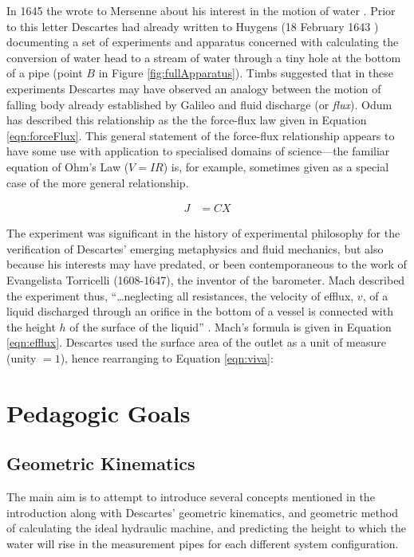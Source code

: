 \documentclass{article}
\begin{document}
In 1645 the  wrote to Mersenne about his interest in the motion of water \cite[p.~138,sec.~571]{descartes_philosophical_1991-1}. Prior to this letter Descartes had already written to Huygens (18 February 1643 \cite[III]{descartes_descartes_2001}) documenting a set of experiments and apparatus concerned with calculating the conversion of water head to a stream of water through a tiny hole at the bottom of a pipe (point \(\textit{B}\) in Figure \ref{fig:fullApparatus}). Timbs \cite[p.~41]{john_timbs_wonderful_1868} suggested that in these experiments Descartes may have observed an analogy between the motion of falling body already established by Galileo and fluid discharge (or \textit{flux}). Odum has described this relationship as the the force-flux law given in Equation \ref{eqn:forceFlux}. This general statement of the force-flux relationship appears to have some use with application to specialised domains of science---the familiar equation of Ohm's Law (\(V = IR\)) is, for example, sometimes given as a special case of the more general relationship.

\begin{align}
    J & = CX \label{eqn:forceFlux}
\end{align}

The experiment was significant in the history of experimental philosophy for the verification of Descartes' emerging metaphysics and fluid mechanics, but also because his interests may have predated, or been contemporaneous to the work of Evangelista Torricelli (1608-1647), the inventor of the barometer. Mach described the experiment thus, ``\dots neglecting all resistances, the velocity of efflux, \(v\), of a liquid discharged through an orifice in the bottom of a vessel is connected with the height \(h\) of the surface of the liquid''  \cite[p.~~402]{mach_science_1919}. Mach's formula is given in Equation \ref{eqn:efflux}. Descartes used the surface area of the outlet as a unit of measure (unity \(= 1\)), hence rearranging to Equation \ref{eqn:viva}:


\section{Pedagogic Goals}

\subsection{Geometric Kinematics}

The main aim is to attempt to introduce several concepts mentioned in the introduction along with Descartes' geometric kinematics, and geometric method of calculating the ideal hydraulic machine, and predicting the height to which the water will rise in the measurement pipes for each different system configuration.
\end{document}
